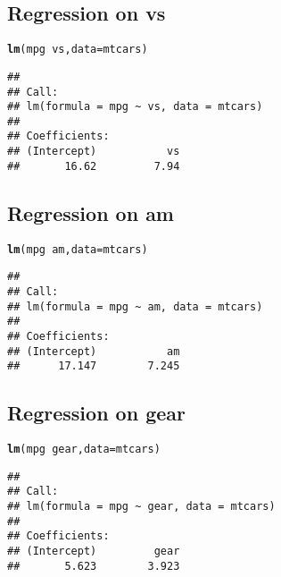 \documentclass{article}\usepackage[]{graphicx}\usepackage[]{color}
\makeatletter
\newcommand{\hlopt}[1]{\textcolor[rgb]{0,0,0}{#1}}%
\newcommand{\hlstd}[1]{\textcolor[rgb]{0.345,0.345,0.345}{#1}}%
\newcommand{\hlkwc}[1]{\textcolor[rgb]{0.333,0.667,0.333}{#1}}%
\newcommand{\hlkwd}[1]{\textcolor[rgb]{0.737,0.353,0.396}{\textbf{#1}}}%
\newenvironment{kframe}{%
 \def\at@end@of@kframe{}%
 \ifinner\ifhmode%
  \def\at@end@of@kframe{\end{minipage}}%
  \begin{minipage}{\columnwidth}%
 \fi\fi%
 \def\FrameCommand##1{\hskip\@totalleftmargin \hskip-\fboxsep
 \colorbox{shadecolor}{##1}\hskip-\fboxsep
     \hskip-\linewidth \hskip-\@totalleftmargin \hskip\columnwidth}%
 \MakeFramed {\advance\hsize-\width
   \@totalleftmargin\z@ \linewidth\hsize
   \@setminipage}}%
 {\par\unskip\endMakeFramed%
 \at@end@of@kframe}
\newenvironment{knitrout}{}{} %
\makeatother
\begin{document}
\subsection{Regression on vs}
\begin{knitrout}
\color{fgcolor}\begin{kframe}
\begin{alltt}
\hlkwd{lm}\hlstd{(mpg}\hlopt{~}\hlstd{vs,} \hlkwc{data}\hlstd{=mtcars)}
\end{alltt}
\begin{verbatim}
## 
## Call:
## lm(formula = mpg ~ vs, data = mtcars)
## 
## Coefficients:
## (Intercept)           vs  
##       16.62         7.94
\end{verbatim}
\end{kframe}
\end{knitrout}
\subsection{Regression on am}
\begin{knitrout}
\color{fgcolor}\begin{kframe}
\begin{alltt}
\hlkwd{lm}\hlstd{(mpg}\hlopt{~}\hlstd{am,} \hlkwc{data}\hlstd{=mtcars)}
\end{alltt}
\begin{verbatim}
## 
## Call:
## lm(formula = mpg ~ am, data = mtcars)
## 
## Coefficients:
## (Intercept)           am  
##      17.147        7.245
\end{verbatim}
\end{kframe}
\end{knitrout}
\subsection{Regression on gear}
\begin{knitrout}
\color{fgcolor}\begin{kframe}
\begin{alltt}
\hlkwd{lm}\hlstd{(mpg}\hlopt{~}\hlstd{gear,} \hlkwc{data}\hlstd{=mtcars)}
\end{alltt}
\begin{verbatim}
## 
## Call:
## lm(formula = mpg ~ gear, data = mtcars)
## 
## Coefficients:
## (Intercept)         gear  
##       5.623        3.923
\end{verbatim}
\end{kframe}
\end{knitrout}
\end{document}
